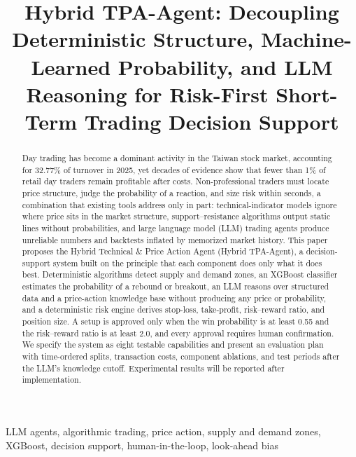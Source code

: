 \documentclass[conference]{IEEEtran}
\begin{document}
\title{Hybrid TPA-Agent: Decoupling Deterministic Structure, Machine-Learned Probability, and LLM Reasoning for Risk-First Short-Term Trading Decision Support}

\author{
}

\maketitle

\begin{abstract}
Day trading has become a dominant activity in the Taiwan stock market, accounting for 32.77\% of turnover in 2025, yet decades of evidence show that fewer than 1\% of retail day traders remain profitable after costs. Non-professional traders must locate price structure, judge the probability of a reaction, and size risk within seconds, a combination that existing tools address only in part: technical-indicator models ignore where price sits in the market structure, support--resistance algorithms output static lines without probabilities, and large language model (LLM) trading agents produce unreliable numbers and backtests inflated by memorized market history. This paper proposes the Hybrid Technical \& Price Action Agent (Hybrid TPA-Agent), a decision-support system built on the principle that each component does only what it does best. Deterministic algorithms detect supply and demand zones, an XGBoost classifier estimates the probability of a rebound or breakout, an LLM reasons over structured data and a price-action knowledge base without producing any price or probability, and a deterministic risk engine derives stop-loss, take-profit, risk--reward ratio, and position size. A setup is approved only when the win probability is at least 0.55 and the risk--reward ratio is at least 2.0, and every approval requires human confirmation. We specify the system as eight testable capabilities and present an evaluation plan with time-ordered splits, transaction costs, component ablations, and test periods after the LLM's knowledge cutoff. Experimental results will be reported after implementation.
\end{abstract}

\begin{IEEEkeywords}
LLM agents, algorithmic trading, price action, supply and demand zones, XGBoost, decision support, human-in-the-loop, look-ahead bias
\end{IEEEkeywords}
\end{document}
